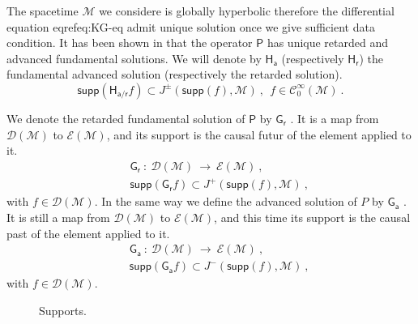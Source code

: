 \documentclass[10pt]{book}
\newcommand{\supp}{\mathsf{supp}}
\newcommand{\Ccal}{\mathcal{C}}
\newcommand{\Dcal}{\mathcal{D}}
\newcommand{\Ecal}{\mathcal{E}}
\newcommand{\Mcal}{\mathcal{M}}
\newcommand{\Gsf}{\mathsf{G}}
\newcommand{\Hsf}{\mathsf{H}}
\newcommand{\Psf}{\mathsf{P}}
\newcommand{\asf}{\mathsf{a}}
\newcommand{\rsf}{\mathsf{r}}
\theoremstyle{break}
\begin{document}
\bigskip


The spacetime $\Mcal$ we considere is globally hyperbolic therefore the differential equation eqref{eq:KG-eq} admit unique solution once we give sufficient data condition. It has been shown in \cite{baer_wave_2008} that the operator $\Psf$ has unique retarded and advanced fundamental solutions. We will denote by $\Hsf_\asf$ (respectively $\Hsf_\rsf$) the fundamental advanced solution (respectively the retarded solution). 
%
\begin{equation*}
\supp\left( \Hsf_{\asf/\rsf} f \right) \subset J^{\pm}\left(\supp\left(f\right),\Mcal\right) \ , \ \ f \in \Ccal^\infty_0(\Mcal) \ . 
\end{equation*}
%



\bigskip


We denote the retarded fundamental solution of $\Psf$ by $\Gsf_{\mathsf{r}}$ \index{$\Gsf_{\mathsf{r}}$}. It is a map from $\Dcal(\Mcal)$ to $\Ecal(\Mcal)$, and its support is the causal futur of the element applied to it.
%
\begin{eqnarray}
&& \Gsf_{\mathsf{r}} \ : \ \mathcal{D}(\Mcal) \ \to \ \mathcal{E}(\Mcal) \ , \\
&& \supp\left(\Gsf_{\mathsf{r}} f\right) \subset J^{+}\left(\supp\left(f\right),\Mcal\right) \ , 
\end{eqnarray}
%
with $f \in \mathcal{D}(\Mcal)$. In the same way we define the advanced solution of $P$ by $\Gsf_{\mathsf{a}}$ \index{$\Gsf_{\mathsf{a}}$}. It is still a map from $\Dcal(\Mcal)$ to $\Ecal(\Mcal)$, and this time its support is the causal past of the element applied to it.
%
\begin{eqnarray}
&& \Gsf_{\mathsf{a}} \ : \ \mathcal{D}(\Mcal) \ \to \ \mathcal{E}(\Mcal) \ , \\
&& \supp\left(\Gsf_{\mathsf{a}} f\right) \subset J^{-}\left(\supp\left(f\right),\Mcal\right) \ ,
\end{eqnarray} 
%
with $f \in \mathcal{D}(\Mcal)$. \par
%
\begin{figure}[h]
\centering
{} 
\caption{Supports.}
\label{fig:SuppSolFonda}
\end{figure}
\end{document}
